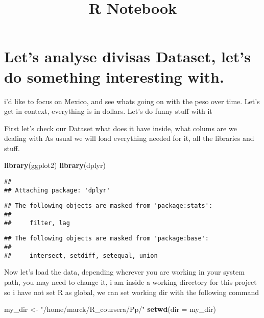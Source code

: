 \documentclass[]{article}
\title{R Notebook}
\author{}
\date{\vspace{-2.5em}}
\newenvironment{Shaded}{\begin{snugshade}}{\end{snugshade}}
\newcommand{\DataTypeTok}[1]{\textcolor[rgb]{0.13,0.29,0.53}{#1}}
\newcommand{\KeywordTok}[1]{\textcolor[rgb]{0.13,0.29,0.53}{\textbf{#1}}}
\newcommand{\NormalTok}[1]{#1}
\newcommand{\StringTok}[1]{\textcolor[rgb]{0.31,0.60,0.02}{#1}}
\begin{document}
\maketitle

\hypertarget{lets-analyse-divisas-dataset-lets-do-something-interesting-with.}{%
\section{Let's analyse divisas Dataset, let's do something interesting
with.}\label{lets-analyse-divisas-dataset-lets-do-something-interesting-with.}}

i'd like to focus on Mexico, and see whats going on with the peso over
time. Let's get in context, everything is in dollars. Let's do funny
stuff with it

First let's check our Dataset what does it have inside, what colums are
we dealing with As usual we will load everything needed for it, all the
libraries and stuff.

\begin{Shaded}
\begin{Highlighting}[]
\KeywordTok{library}\NormalTok{(ggplot2)}
\KeywordTok{library}\NormalTok{(dplyr)}
\end{Highlighting}
\end{Shaded}

\begin{verbatim}
## 
## Attaching package: 'dplyr'
\end{verbatim}

\begin{verbatim}
## The following objects are masked from 'package:stats':
## 
##     filter, lag
\end{verbatim}

\begin{verbatim}
## The following objects are masked from 'package:base':
## 
##     intersect, setdiff, setequal, union
\end{verbatim}

Now let's load the data, depending wherever you are working in your
system path, you may need to change it, i am inside a working directory
for this project so i have not set R as global, we can set working dir
with the following command

\begin{Shaded}
\begin{Highlighting}[]
\NormalTok{my_dir <-}\StringTok{ "/home/marck/R_coursera/Pp/"}
\KeywordTok{setwd}\NormalTok{(}\DataTypeTok{dir =}\NormalTok{ my_dir)}
\end{Highlighting}
\end{Shaded}
\end{document}
